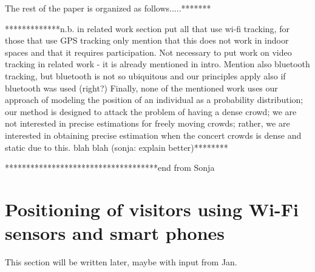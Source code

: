 \documentclass[10pt,a4paper]{article}
\begin{document}
The rest of the paper is organized as follows.....******* 

*************n.b. in related work section put all that use wi-fi tracking, for those that use GPS tracking only mention that this does not work in indoor spaces and that it requires participation. Not necessary to put work on video tracking in related work - it is already mentioned in intro. Mention also bluetooth tracking, but bluetooth is not so ubiquitous and our principles apply also if bluetooth was used (right?) 
Finally, none of the mentioned work uses our approach of modeling the position of an individual as a probability distribution; our method is designed to attack the problem of having a dense crowd; we are not interested in precise estimations for freely moving crowds; rather, we are interested in obtaining precise estimation when the  concert crowds is dense and static due to this. blah blah (sonja: explain better)********

************************************end from Sonja

\section{Positioning of visitors using Wi-Fi sensors and smart phones}


This section will be written later, maybe with input from Jan.
\end{document}
